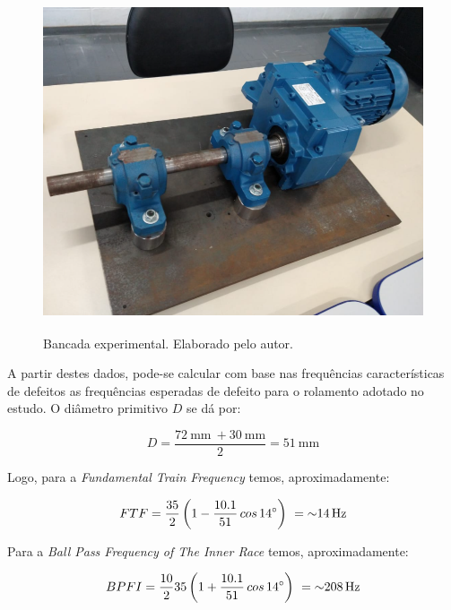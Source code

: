 \documentclass[
	12pt,				
	oneside,			
	a4paper,			
	english,			
	brazil,			
	]{abntex2ppgsi}
\begin{document}
\begin{figure}[H]
\centering
\includegraphics[width=\textwidth,height=100mm,keepaspectratio]{bancada_de_testes}
\caption {Bancada experimental. Elaborado pelo autor.}
\label{bancada_de_testes}
\end{figure}

A partir destes dados, pode-se calcular com base nas frequências características de defeitos as frequências esperadas de defeito para o rolamento adotado no estudo. O diâmetro primitivo $D$ se dá por: 

\begin{equation}
	D = \frac{\SI{72}{\mm} \ + \SI{30}{\mm}}{2} = \SI{51}{\mm}
	\label{eq: Diametro Primitivo no Rolamento}
\end{equation}



Logo, para a \textit{Fundamental Train Frequency} temos, aproximadamente:

\begin{equation}
	FTF = \frac{35}{2} \left ( 1 - \frac{10.1}{51} \,cos \, \ang{14} \right )  \ = \SI{~14}{{\hertz}}
	\label{eq: FTF no  Rolamento}
\end{equation}


Para a \textit{Ball Pass Frequency of The Inner Race} temos, aproximadamente:

\begin{equation}
	BPFI = \frac{10}{2}35 \left ( 1 + \frac{10.1}{51} \,cos \, \ang{14} \right )  \ = \SI{~208}{{\hertz}}
	\label{eq: BPFI no rolamento}
\end{equation}
\end{document}
